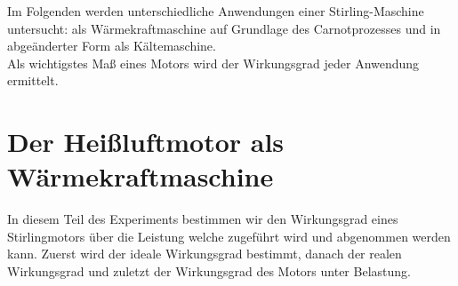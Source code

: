\documentclass[12pt,a4paper]{article}
\begin{document}
\begin{multicols}{2}




%			


\noindent Im Folgenden werden unterschiedliche Anwendungen einer Stirling-Maschine untersucht: als Wärmekraftmaschine auf Grundlage des Carnotprozesses und in abgeänderter Form als Kältemaschine.\\
Als wichtigstes Maß eines Motors wird der Wirkungsgrad jeder Anwendung ermittelt.


\section{Der Heißluftmotor als Wärmekraftmaschine}
In diesem Teil des Experiments bestimmen wir den Wirkungsgrad eines Stirlingmotors über die Leistung welche zugeführt wird und abgenommen werden kann. Zuerst wird der ideale Wirkungsgrad bestimmt, danach der realen Wirkungsgrad und zuletzt der Wirkungsgrad des Motors unter Belastung.


\end{multicols}
\end{document}
